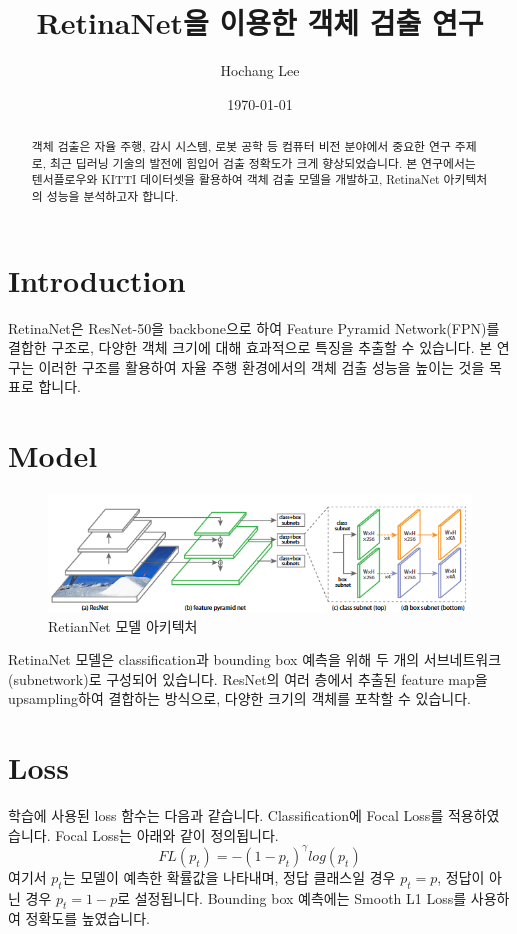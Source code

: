 \documentclass[12pt]{article}
\title{RetinaNet을 이용한 객체 검출 연구}
\author{Hochang Lee}
\date{\today}
\begin{document}
\maketitle

\begin{abstract}
객체 검출은 자율 주행, 감시 시스템, 로봇 공학 등 컴퓨터 비전 분야에서 중요한 연구 주제로, 최근 딥러닝 기술의 발전에 힘입어 검출 정확도가 크게 향상되었습니다. 본 연구에서는 텐서플로우와 KITTI 데이터셋을 활용하여 객체 검출 모델을 개발하고, RetinaNet 아키텍처의 성능을 분석하고자 합니다.
\end{abstract}

\section{Introduction}
RetinaNet은 ResNet-50을 backbone으로 하여 Feature Pyramid Network(FPN)를 결합한 구조로, 다양한 객체 크기에 대해 효과적으로 특징을 추출할 수 있습니다. 본 연구는 이러한 구조를 활용하여 자율 주행 환경에서의 객체 검출 성능을 높이는 것을 목표로 합니다.

\section{Model}
\begin{figure}[h!]
    \centering
    \includegraphics[width=0.75\linewidth]{image.png}
    \caption{RetianNet 모델 아키텍처}
    \label{fig:enter-label}
\end{figure}
RetinaNet 모델은 classification과 bounding box 예측을 위해 두 개의 서브네트워크(subnetwork)로 구성되어 있습니다. ResNet의 여러 층에서 추출된 feature map을 upsampling하여 결합하는 방식으로, 다양한 크기의 객체를 포착할 수 있습니다. 

\section{Loss}
학습에 사용된 loss 함수는 다음과 같습니다. Classification에 Focal Loss를 적용하였습니다. Focal Loss는 아래와 같이 정의됩니다. 
$$FL(p_t) = - (1 - p_t)^\gamma log(p_t)$$
여기서 $p_t$는 모델이 예측한 확률값을 나타내며, 정답 클래스일 경우 $p_t = p$, 정답이 아닌 경우 $p_t = 1 - p$로 설정됩니다. Bounding box 예측에는 Smooth L1 Loss를 사용하여 정확도를 높였습니다. 
\end{document}
